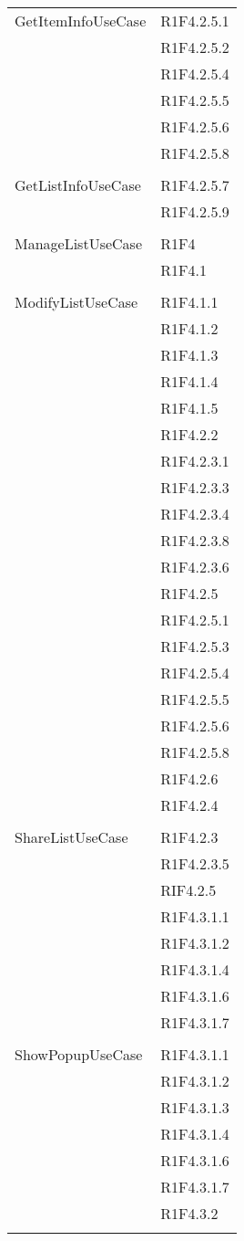 \begin{center}
\begin{longtable}{|p{7cm}|p{7cm}|}
		GetItemInfoUseCase & R1F4.2.5.1 \\ & R1F4.2.5.2 \\ & R1F4.2.5.4 \\ & R1F4.2.5.5 \\ & R1F4.2.5.6 \\ & R1F4.2.5.8 \\ & \\ \hline
		GetListInfoUseCase & R1F4.2.5.7 \\ & R1F4.2.5.9 \\ & \\ \hline
		ManageListUseCase & R1F4 \\ & R1F4.1 \\ & \\ \hline
		ModifyListUseCase & R1F4.1.1 \\ & R1F4.1.2 \\ & R1F4.1.3 \\ & R1F4.1.4 \\ & R1F4.1.5 \\ & R1F4.2.2 \\ & R1F4.2.3.1 \\ & R1F4.2.3.3 \\ & R1F4.2.3.4 \\ & R1F4.2.3.8 \\ & R1F4.2.3.6 \\ & R1F4.2.5 \\ & R1F4.2.5.1 \\ & R1F4.2.5.3 \\ & R1F4.2.5.4 \\ & R1F4.2.5.5 \\ & R1F4.2.5.6 \\ & R1F4.2.5.8 \\ & R1F4.2.6 \\ & R1F4.2.4 \\ & \\ \hline
		ShareListUseCase & R1F4.2.3 \\ & R1F4.2.3.5 \\ & RIF4.2.5 \\ & R1F4.3.1.1 \\ & R1F4.3.1.2 \\ & R1F4.3.1.4 \\ & R1F4.3.1.6 \\ & R1F4.3.1.7 \\ & \\ \hline
		ShowPopupUseCase & R1F4.3.1.1 \\ & R1F4.3.1.2 \\ & R1F4.3.1.3 \\ & R1F4.3.1.4 \\ & R1F4.3.1.6 \\ & R1F4.3.1.7 \\ & R1F4.3.2 \\ & \\ \hline
	\end{longtable}
\end{center}
